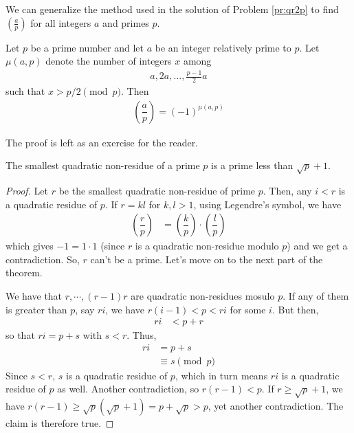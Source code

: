 \documentclass[main.tex]{subfile}
\begin{document}
We can generalize the method used in the solution of Problem \ref{pr:qr2p} to find $ \left(\frac{a}{p}\right)$ for all integers $a$ and primes $p$.
	\begin{theorem}\label{thm:gausscriterion}
		Let $p$ be a prime number and let $a$ be an integer relatively prime to $p$. Let $\mu(a,p)$ denote the number of integers $x$ among
		\begin{align*}
		a, 2a, \ldots, \frac{p-1}{2}a
		\end{align*}
		such that $\displaystyle x > p/2 \pmod p$. Then
		\begin{align*}
		\left(\dfrac{a}{p}\right) = (-1)^{\mu(a,p)}
		\end{align*}
	\end{theorem}

The proof is left as an exercise for the reader.
		\begin{theorem}
			The smallest quadratic non-residue of a prime $p$ is a prime less than $\sqrt{p}+1$.
		\end{theorem}

		\begin{proof}
			Let $r$ be the smallest quadratic non-residue of prime $p$. Then, any $i<r$ is a quadratic residue of $p$. If $r=kl$ for $k,l>1$, using Legendre's symbol, we have
			\begin{align*}
				\left(\dfrac{r}{p}\right) & = \left(\dfrac{k}{p}\right)\cdot\left(\dfrac{l}{p}\right)
			\end{align*}
			which gives $-1=1\cdot 1$ (since $r$ is a quadratic non-residue modulo $p$) and we get a contradiction. So, $r$ can't be a prime. Let's move on to the next part of the theorem.

			We have that $r,\cdots,(r-1)r$ are quadratic non-residues mosulo $p$. If any of them is greater than $p$, say $ri$, we have $r(i-1)<p<ri$ for some $i$. But then,
			\begin{align*}
				ri & < p+r
			\end{align*}
			so that $ri=p+s$ with $s<r$. Thus,
			\begin{align*}
				ri & = p+s\\
				& \equiv s\pmod p
			\end{align*}
			Since $s<r$, $s$ is a quadratic residue of $p$, which in turn means $ri$ is a quadratic residue of $p$ as well. Another contradiction, so $r(r-1)<p$. If $r\geq\sqrt{p}+1$, we have $r(r-1)\geq\sqrt{p}(\sqrt{p}+1)=p+\sqrt{p}>p$, yet another contradiction. The claim is therefore true.
		\end{proof}
\end{document}
